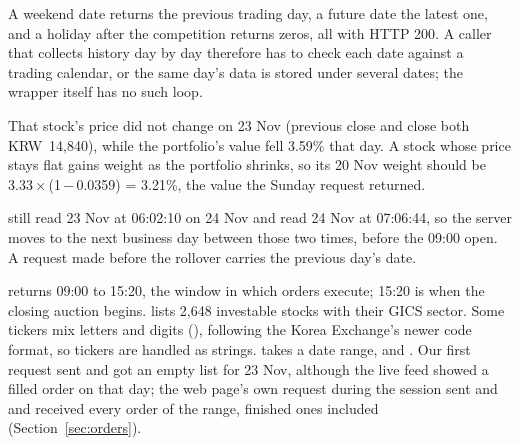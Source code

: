  A weekend date returns the previous trading day, a future date the latest one, and a holiday after the competition returns zeros, all with HTTP 200. A caller that collects history day by day therefore has to check each date against a trading calendar, or the same day's data is stored under several dates; the wrapper itself has no such loop.



 That stock's price did not change on 23 Nov (previous close and close both KRW~14,840), while the portfolio's value fell 3.59\% that day. A stock whose price stays flat gains weight as the portfolio shrinks, so its 20 Nov weight should be 3.33\,×\,(1\,−\,0.0359) = 3.21\%, the value the Sunday request returned.

  still read 23 Nov at 06:02:10 on 24 Nov and read 24 Nov at 07:06:44, so the server moves to the next business day between those two times, before the 09:00 open. A request made before the rollover carries the previous day's date.

  returns 09:00 to 15:20, the window in which orders execute; 15:20 is when the closing auction begins.  lists 2,648 investable stocks with their GICS sector. Some tickers mix letters and digits (), following the Korea Exchange's newer code format, so tickers are handled as strings.  takes a date range,  and . Our first request sent  and got an empty list for 23 Nov, although the live feed showed a filled order on that day; the web page's own request during the session sent  and  and received every order of the range, finished ones included (Section~\ref{sec:orders}).


